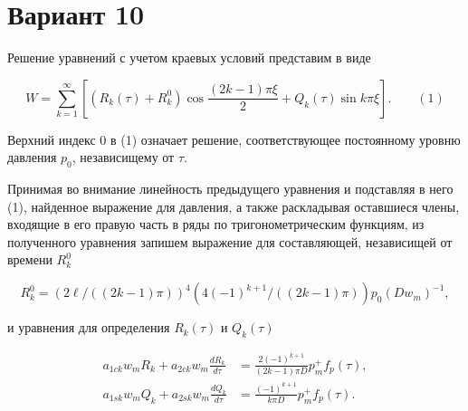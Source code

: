 \documentclass{article}
\begin{document}
\section*{Вариант 10}

Решение уравнений с учетом краевых условий представим в виде

\[
W = \sum_{k=1}^{\infty} \left[ (R_k(\tau) + R_k^0) \cos \frac{(2k-1)\pi\xi}{2} + Q_k(\tau) \sin k\pi\xi \right]. \qquad (1)
\]

Верхний индекс 0 в (1) означает решение, соответствующее постоянному уровню давления $p_0$, независищему от $\tau$.

Принимая во внимание линейность предыдущего уравнения и подставляя в него (1), найденное выражение для давления, а также раскладывая оставшиеся члены, входящие в его правую часть в ряды по тригонометрическим функциям, из полученного уравнения запишем выражение для составляющей, независищей от времени $R_k^0$

\[
R_k^0 = (2\ell / ((2k-1)\pi))^4 (4(-1)^{k+1} / ((2k-1)\pi)) p_0(Dw_m)^{-1},
\]

и уравнения для определения $R_k(\tau)$ и $Q_k(\tau)$

\[
\begin{aligned} 
a_{1ck} w_m R_k + a_{2ck} w_m \frac{dR_k}{d\tau} &= \frac{2(-1)^{k+1}}{(2k-1)\pi D} p_m^+ f_p(\tau), \tag{2} \\ 
a_{1sk} w_m Q_k + a_{2sk} w_m \frac{dQ_k}{d\tau} &= \frac{(-1)^{k+1}}{k\pi D} p_m^+ f_p(\tau). \tag{3}
\end{aligned}
\]
\end{document}
